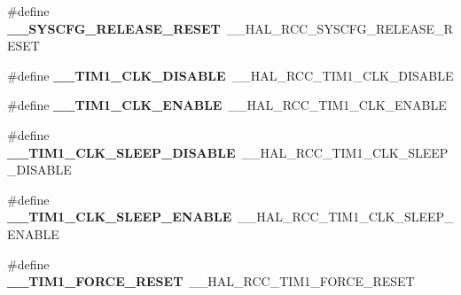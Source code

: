 \begin{DoxyCompactItemize}
\item 
\#define {\bfseries \+\_\+\+\_\+\+S\+Y\+S\+C\+F\+G\+\_\+\+R\+E\+L\+E\+A\+S\+E\+\_\+\+R\+E\+S\+ET}~\+\_\+\+\_\+\+H\+A\+L\+\_\+\+R\+C\+C\+\_\+\+S\+Y\+S\+C\+F\+G\+\_\+\+R\+E\+L\+E\+A\+S\+E\+\_\+\+R\+E\+S\+ET\hypertarget{group___h_a_l___r_c_c___aliased_ga9460d38c3a8c209620b68453a12c6c56}{}\label{group___h_a_l___r_c_c___aliased_ga9460d38c3a8c209620b68453a12c6c56}

\item 
\#define {\bfseries \+\_\+\+\_\+\+T\+I\+M1\+\_\+\+C\+L\+K\+\_\+\+D\+I\+S\+A\+B\+LE}~\+\_\+\+\_\+\+H\+A\+L\+\_\+\+R\+C\+C\+\_\+\+T\+I\+M1\+\_\+\+C\+L\+K\+\_\+\+D\+I\+S\+A\+B\+LE\hypertarget{group___h_a_l___r_c_c___aliased_gac374cff1e951672a19aa5857c58674f7}{}\label{group___h_a_l___r_c_c___aliased_gac374cff1e951672a19aa5857c58674f7}

\item 
\#define {\bfseries \+\_\+\+\_\+\+T\+I\+M1\+\_\+\+C\+L\+K\+\_\+\+E\+N\+A\+B\+LE}~\+\_\+\+\_\+\+H\+A\+L\+\_\+\+R\+C\+C\+\_\+\+T\+I\+M1\+\_\+\+C\+L\+K\+\_\+\+E\+N\+A\+B\+LE\hypertarget{group___h_a_l___r_c_c___aliased_gaca66d24989c6306dabafd38dd3b2a34f}{}\label{group___h_a_l___r_c_c___aliased_gaca66d24989c6306dabafd38dd3b2a34f}

\item 
\#define {\bfseries \+\_\+\+\_\+\+T\+I\+M1\+\_\+\+C\+L\+K\+\_\+\+S\+L\+E\+E\+P\+\_\+\+D\+I\+S\+A\+B\+LE}~\+\_\+\+\_\+\+H\+A\+L\+\_\+\+R\+C\+C\+\_\+\+T\+I\+M1\+\_\+\+C\+L\+K\+\_\+\+S\+L\+E\+E\+P\+\_\+\+D\+I\+S\+A\+B\+LE\hypertarget{group___h_a_l___r_c_c___aliased_ga4c6a5618073539cc5ae7f4662dfa96d9}{}\label{group___h_a_l___r_c_c___aliased_ga4c6a5618073539cc5ae7f4662dfa96d9}

\item 
\#define {\bfseries \+\_\+\+\_\+\+T\+I\+M1\+\_\+\+C\+L\+K\+\_\+\+S\+L\+E\+E\+P\+\_\+\+E\+N\+A\+B\+LE}~\+\_\+\+\_\+\+H\+A\+L\+\_\+\+R\+C\+C\+\_\+\+T\+I\+M1\+\_\+\+C\+L\+K\+\_\+\+S\+L\+E\+E\+P\+\_\+\+E\+N\+A\+B\+LE\hypertarget{group___h_a_l___r_c_c___aliased_ga3ffdcca982a4a5d4b024e43cbcb5f1fe}{}\label{group___h_a_l___r_c_c___aliased_ga3ffdcca982a4a5d4b024e43cbcb5f1fe}

\item 
\#define {\bfseries \+\_\+\+\_\+\+T\+I\+M1\+\_\+\+F\+O\+R\+C\+E\+\_\+\+R\+E\+S\+ET}~\+\_\+\+\_\+\+H\+A\+L\+\_\+\+R\+C\+C\+\_\+\+T\+I\+M1\+\_\+\+F\+O\+R\+C\+E\+\_\+\+R\+E\+S\+ET\hypertarget{group___h_a_l___r_c_c___aliased_ga42e9934d811e4a1eb3e1315ced3f9616}{}\label{group___h_a_l___r_c_c___aliased_ga42e9934d811e4a1eb3e1315ced3f9616}


\end{DoxyCompactItemize}
